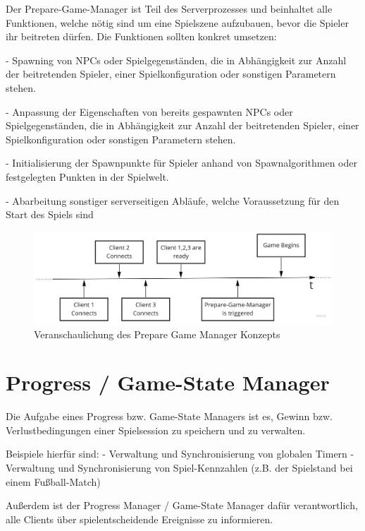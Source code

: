 Der Prepare-Game-Manager ist Teil des Serverprozesses und beinhaltet alle Funktionen, welche nötig sind um eine Spielszene aufzubauen, bevor die Spieler ihr beitreten dürfen. Die Funktionen sollten konkret umsetzen:

- Spawning \cite{Wikipedia.2020} von NPCs \cite{Wikipedia.2021f} oder Spielgegenständen, die in Abhängigkeit zur Anzahl der beitretenden Spieler, einer Spielkonfiguration oder sonstigen Parametern stehen.

- Anpassung der Eigenschaften von bereits gespawnten NPCs oder Spielgegenständen, die in Abhängigkeit zur Anzahl der beitretenden Spieler, einer Spielkonfiguration oder sonstigen Parametern stehen.

- Initialisierung der Spawnpunkte für Spieler anhand von Spawnalgorithmen oder festgelegten Punkten in der Spielwelt.

- Abarbeitung sonstiger serverseitigen Abläufe, welche Voraussetzung für den Start des Spiels sind

\begin{figure}
	\centering
	\includegraphics[width=150mm]{images/prepare_game_manager.jpg}
	\caption[Prepare-Game-Manager]{Veranschaulichung des Prepare Game Manager Konzepts}
	\label{pic:prepare_game_manager}
\end{figure}

\section{Progress / Game-State Manager}
\label{progress_manager}

Die Aufgabe eines Progress bzw. Game-State Managers ist es, Gewinn bzw. Verlustbedingungen einer Spielsession zu speichern und zu verwalten. 

Beispiele hierfür sind:
- Verwaltung und Synchronisierung von globalen Timern
- Verwaltung und Synchronisierung von Spiel-Kennzahlen (z.B. der Spielstand bei einem Fußball-Match)

Außerdem ist der Progress Manager / Game-State Manager dafür verantwortlich, alle Clients über spielentscheidende Ereignisse zu informieren. 

